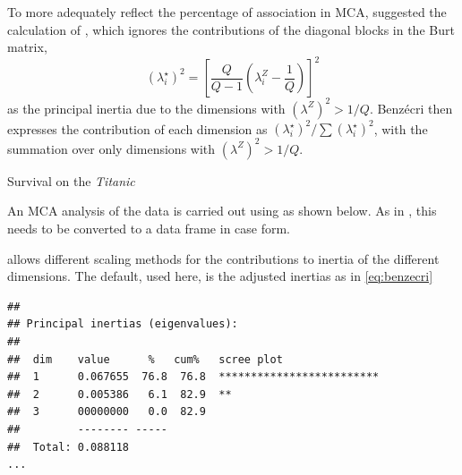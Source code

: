 \documentclass[11pt]{book}
\renewenvironment{knitrout}{\small\renewcommand{\baselinestretch}{.85}}{} %
\begin{document}
To more adequately reflect the percentage of association in MCA,
\citet{Benzecri:77} suggested the calculation of
, which ignores the contributions of
the diagonal blocks in the Burt matrix,  
\begin{equation}\label{eq:benzecri}
(\lambda_i^{\star})^2 =
{\left[ \frac{Q}{Q-1} ( \lambda_i^Z - \frac{1}{Q} ) \right]}^2
\end{equation}
as the principal inertia due to the dimensions with $(\lambda^Z)^2 > 1/Q$.
Benz{\'e}cri then expresses the contribution of each dimension as
$ (\lambda_i^{\star})^2 / \sum (\lambda_i^{\star})^2$,
with the summation over only dimensions with $(\lambda^Z)^2 > 1/Q$.


\begin{Example}[titanic2]{Survival on the \emph{Titanic}}

An MCA analysis of the  data is carried out
using 
as shown below.  As in ,
this needs to be converted to a data frame in case form.

\begin{knitrout}
\color{fgcolor}\begin{kframe}
\begin{alltt}
 \hlkwb{<-} \hlstd{(}
 \hlkwb{<-} 
\end{alltt}
\end{kframe}
\end{knitrout}
 allows different scaling methods for the contributions to inertia
of the different dimensions.  The default, used here, is the adjusted inertias
as in \eqref{eq:benzecri}
\begin{knitrout}
\color{fgcolor}\begin{kframe}
\begin{alltt}
\end{alltt}
\begin{verbatim}
## 
## Principal inertias (eigenvalues):
## 
##  dim    value      %   cum%   scree plot               
##  1      0.067655  76.8  76.8  *************************
##  2      0.005386   6.1  82.9  **                       
##  3      00000000   0.0  82.9                           
##         -------- -----                                 
##  Total: 0.088118                                       
...
\end{verbatim}
\end{kframe}
\end{knitrout}


\end{Example}
\end{document}
